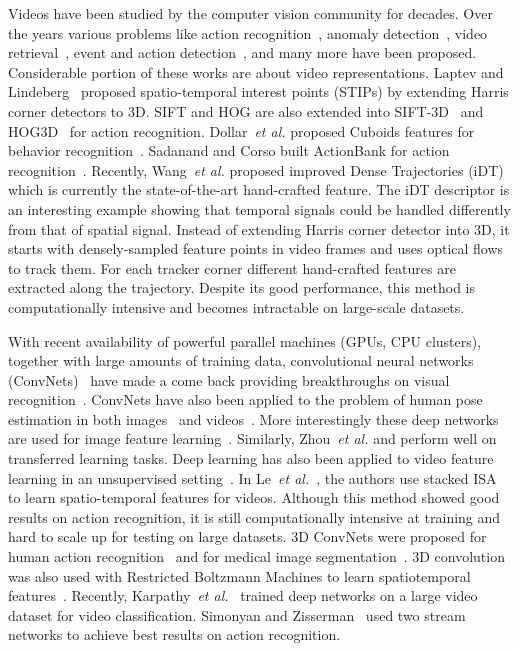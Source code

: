 \documentclass[10pt,twocolumn,letterpaper]{article}
\begin{document}
Videos have been studied by the computer vision community for decades. Over the years various problems like action recognition~\cite{Laptev03}, anomaly detection~\cite{Boiman07}, video retrieval~\cite{bendersky14}, event and action detection~\cite{TRECVID,THUMOS14}, and many more have been proposed. Considerable portion of these works are about video representations. Laptev and Lindeberg~\cite{Laptev03} proposed spatio-temporal interest points (STIPs) by extending Harris corner detectors to $3$D. SIFT and HOG are also extended into SIFT-$3$D~\cite{Scovanner07} and HOG3D~\cite{KMS08} for action recognition. Dollar~\emph{et al.} proposed Cuboids features for behavior recognition~\cite{Piotr05}. Sadanand and Corso built ActionBank for action recognition~\cite{ActionBank}. Recently, Wang~\emph{et al.} proposed improved Dense Trajectories (iDT)~\cite{Wang2013} which is currently the state-of-the-art hand-crafted feature. The iDT descriptor is an interesting example showing that temporal signals could be handled differently from that of spatial signal. Instead of extending Harris corner detector into 3D, it starts with densely-sampled feature points in video frames and uses optical flows to track them. For each tracker corner different hand-crafted features are extracted along the trajectory. Despite its good performance, this method is computationally intensive and becomes intractable on large-scale datasets.

With recent availability of powerful parallel machines (GPUs, CPU clusters), together with large amounts of training data, convolutional neural networks (ConvNets)~\cite{LeNet5} have made a come back providing breakthroughs on visual recognition~\cite{girshick13,Krizhevsky12}. ConvNets have also been applied to the problem of human pose estimation in both images~\cite{jain14iclr} and videos~\cite{jain14accv}. More interestingly these deep networks are used for image feature learning~\cite{Donahue13}. Similarly, Zhou~\emph{et al.} and perform well on transferred learning tasks. Deep learning has also been applied to video feature learning in an unsupervised setting~\cite{Le2011}. In Le~\emph{et al.}~\cite{Le2011}, the authors use stacked ISA to learn spatio-temporal features for videos. Although this method showed good results on action recognition, it is still computationally intensive at training and hard to scale up for testing on large datasets. $3$D ConvNets were proposed for human action recognition~\cite{Ming2013} and for medical image segmentation~\cite{jain10,turaga2010}. 3D convolution was also used with Restricted Boltzmann Machines to learn spatiotemporal features~\cite{taylor10}. Recently, Karpathy~\emph{et al.}~\cite{Karpathy14} trained deep networks on a large video dataset for video classification. Simonyan and Zisserman~\cite{SimonyanZ14} used two stream networks to achieve best results on action recognition. 
\end{document}
